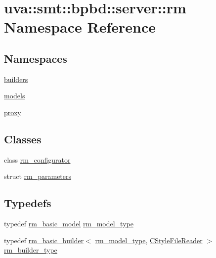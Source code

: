 \hypertarget{namespaceuva_1_1smt_1_1bpbd_1_1server_1_1rm}{}\section{uva\+:\+:smt\+:\+:bpbd\+:\+:server\+:\+:rm Namespace Reference}
\label{namespaceuva_1_1smt_1_1bpbd_1_1server_1_1rm}
\subsection*{Namespaces}
\begin{DoxyCompactItemize}
\item 
 \hyperlink{namespaceuva_1_1smt_1_1bpbd_1_1server_1_1rm_1_1builders}{builders}
\item 
 \hyperlink{namespaceuva_1_1smt_1_1bpbd_1_1server_1_1rm_1_1models}{models}
\item 
 \hyperlink{namespaceuva_1_1smt_1_1bpbd_1_1server_1_1rm_1_1proxy}{proxy}
\end{DoxyCompactItemize}
\subsection*{Classes}
\begin{DoxyCompactItemize}
\item 
class \hyperlink{classuva_1_1smt_1_1bpbd_1_1server_1_1rm_1_1rm__configurator}{rm\+\_\+configurator}
\item 
struct \hyperlink{structuva_1_1smt_1_1bpbd_1_1server_1_1rm_1_1rm__parameters}{rm\+\_\+parameters}
\end{DoxyCompactItemize}
\subsection*{Typedefs}
\begin{DoxyCompactItemize}
\item 
typedef \hyperlink{classuva_1_1smt_1_1bpbd_1_1server_1_1rm_1_1models_1_1rm__basic__model}{rm\+\_\+basic\+\_\+model} \hyperlink{namespaceuva_1_1smt_1_1bpbd_1_1server_1_1rm_a4d0c6c248c7451ba74697118cc6efa00}{rm\+\_\+model\+\_\+type}
\item 
typedef \hyperlink{classuva_1_1smt_1_1bpbd_1_1server_1_1rm_1_1builders_1_1rm__basic__builder}{rm\+\_\+basic\+\_\+builder}$<$ \hyperlink{namespaceuva_1_1smt_1_1bpbd_1_1server_1_1rm_a4d0c6c248c7451ba74697118cc6efa00}{rm\+\_\+model\+\_\+type}, \hyperlink{classuva_1_1utils_1_1file_1_1_c_style_file_reader}{C\+Style\+File\+Reader} $>$ \hyperlink{namespaceuva_1_1smt_1_1bpbd_1_1server_1_1rm_aa3336306eb718435686eba64bdd7685e}{rm\+\_\+builder\+\_\+type}
\end{DoxyCompactItemize}


